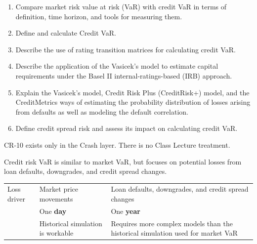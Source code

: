 
\begin{crkeybox}
\begin{enumerate}[label=\textbf{\alph*.},leftmargin=2em]
\item Compare market risk value at risk (VaR) with credit VaR in terms of definition, time horizon, and tools for measuring them.
\item Define and calculate Credit VaR.
\item Describe the use of rating transition matrices for calculating credit VaR.
\item Describe the application of the Vasicek's model to estimate capital requirements under the Basel II internal-ratings-based (IRB) approach.
\item Explain the Vasicek's model, Credit Risk Plus (CreditRisk+) model, and the CreditMetrics ways of estimating the probability distribution of losses arising from defaults as well as modeling the default correlation.
\item Define credit spread risk and assess its impact on calculating credit VaR.
\end{enumerate}
\end{crkeybox}

\begin{crtrapbox}
CR-10 exists only in the Crash layer. There is no Class Lecture treatment.
\end{crtrapbox}


Credit risk VaR is similar to market VaR, but focuses on potential losses from
loan defaults, downgrades, and credit spread changes.

\begin{center}
\footnotesize
\begin{tabular}{L{3.0cm} L{5.6cm} L{5.9cm}}
\toprule
 &  &  \\
\midrule
Loss driver & Market price movements &
  Loan defaults, downgrades, and credit spread changes \\
 & One \textbf{day} & One \textbf{year} \\
 & Historical simulation is workable &
  Requires more complex models than the historical simulation used for market
  VaR \\
\bottomrule
\end{tabular}
\end{center}

